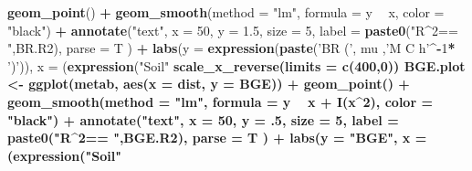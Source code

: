 \documentclass[]{article}
\newenvironment{Shaded}{\begin{snugshade}}{\end{snugshade}}
\newcommand{\KeywordTok}[1]{\textcolor[rgb]{0.13,0.29,0.53}{\textbf{#1}}}
\newcommand{\DataTypeTok}[1]{\textcolor[rgb]{0.13,0.29,0.53}{#1}}
\newcommand{\DecValTok}[1]{\textcolor[rgb]{0.00,0.00,0.81}{#1}}
\newcommand{\FloatTok}[1]{\textcolor[rgb]{0.00,0.00,0.81}{#1}}
\newcommand{\StringTok}[1]{\textcolor[rgb]{0.31,0.60,0.02}{#1}}
\newcommand{\OperatorTok}[1]{\textcolor[rgb]{0.81,0.36,0.00}{\textbf{#1}}}
\newcommand{\NormalTok}[1]{#1}
\begin{document}
\begin{Shaded}
\begin{Highlighting}[]
{\StringTok{  }\KeywordTok{geom_point}\NormalTok{() }\OperatorTok{+}\StringTok{ }
\StringTok{  }\KeywordTok{geom_smooth}\NormalTok{(}\DataTypeTok{method =} \StringTok{"lm"}\NormalTok{, }\DataTypeTok{formula =}\NormalTok{ y }\OperatorTok{~}\StringTok{ }\NormalTok{x, }\DataTypeTok{color =} \StringTok{"black"}\NormalTok{) }\OperatorTok{+}\StringTok{ }
\StringTok{  }\KeywordTok{annotate}\NormalTok{(}\StringTok{"text"}\NormalTok{, }\DataTypeTok{x =} \DecValTok{50}\NormalTok{, }\DataTypeTok{y =} \FloatTok{1.5}\NormalTok{, }\DataTypeTok{size =} \DecValTok{5}\NormalTok{, }\DataTypeTok{label =} \KeywordTok{paste0}\NormalTok{(}\StringTok{"R^2== "}\NormalTok{,BR.R2), }\DataTypeTok{parse =}\NormalTok{ T ) }\OperatorTok{+}
\StringTok{  }\KeywordTok{labs}\NormalTok{(}\DataTypeTok{y =} \KeywordTok{expression}\NormalTok{(}\KeywordTok{paste}\NormalTok{(}\StringTok{'BR ('}\NormalTok{, mu ,}\StringTok{'M C h'}\OperatorTok{^-}\DecValTok{1}\OperatorTok{*}\StringTok{ ')'}\NormalTok{)), }
       \DataTypeTok{x =}\NormalTok{ (}\KeywordTok{expression}\NormalTok{(}\StringTok{"Soil"} \OperatorTok{%
\StringTok{  }\KeywordTok{scale_x_reverse}\NormalTok{(}\DataTypeTok{limits =} \KeywordTok{c}\NormalTok{(}\DecValTok{400}\NormalTok{,}\DecValTok{0}\NormalTok{))}
\NormalTok{BGE.plot <-}\StringTok{ }\KeywordTok{ggplot}\NormalTok{(metab, }\KeywordTok{aes}\NormalTok{(}\DataTypeTok{x =}\NormalTok{ dist, }\DataTypeTok{y =}\NormalTok{ BGE)) }\OperatorTok{+}\StringTok{ }
\StringTok{  }\KeywordTok{geom_point}\NormalTok{() }\OperatorTok{+}\StringTok{ }
\StringTok{  }\KeywordTok{geom_smooth}\NormalTok{(}\DataTypeTok{method =} \StringTok{"lm"}\NormalTok{, }\DataTypeTok{formula =}\NormalTok{ y }\OperatorTok{~}\StringTok{ }\NormalTok{x }\OperatorTok{+}\StringTok{ }\KeywordTok{I}\NormalTok{(x}\OperatorTok{^}\DecValTok{2}\NormalTok{), }\DataTypeTok{color =} \StringTok{"black"}\NormalTok{) }\OperatorTok{+}
\StringTok{  }\KeywordTok{annotate}\NormalTok{(}\StringTok{"text"}\NormalTok{, }\DataTypeTok{x =} \DecValTok{50}\NormalTok{, }\DataTypeTok{y =}\NormalTok{ .}\DecValTok{5}\NormalTok{, }\DataTypeTok{size =} \DecValTok{5}\NormalTok{, }\DataTypeTok{label =} \KeywordTok{paste0}\NormalTok{(}\StringTok{"R^2== "}\NormalTok{,BGE.R2), }\DataTypeTok{parse =}\NormalTok{ T ) }\OperatorTok{+}
\StringTok{  }\KeywordTok{labs}\NormalTok{(}\DataTypeTok{y =} \StringTok{"BGE"}\NormalTok{, }
       \DataTypeTok{x =}\NormalTok{ (}\KeywordTok{expression}\NormalTok{(}\StringTok{"Soil"} \OperatorTok{%
}}}
\end{Highlighting}
\end{Shaded}
\end{document}

